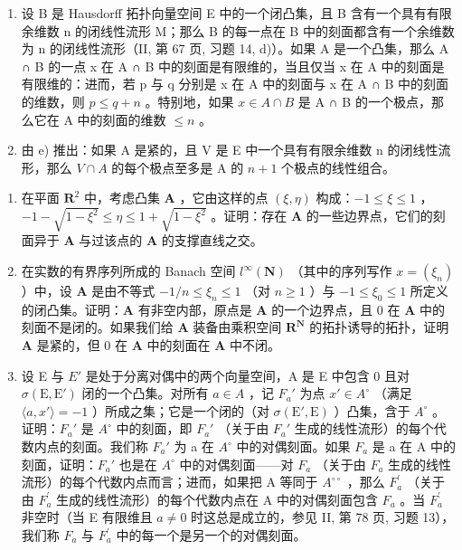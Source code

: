 \begin{enumerate}
\def\labelenumi{\alph{enumi})}
\setcounter{enumi}{4}
\item
  设 B 是 Hausdorff 拓扑向量空间 E 中的一个闭凸集，且 B 含有一个具有有限余维数 n 的闭线性流形 M；那么 B 的每一点在 B 中的刻面都含有一个余维数为 n 的闭线性流形（II, 第 67 页, 习题 14, d)）。如果 A 是一个凸集，那么 A ∩ B 的一点 x 在 A ∩ B 中的刻面是有限维的，当且仅当 x 在 A 中的刻面是有限维的：进而，若 p 与 q 分别是 x 在 A 中的刻面与 x 在 A ∩ B 中的刻面的维数，则 \(p \leqslant q + n\) 。特别地，如果 \(x \in A \cap B\) 是 A ∩ B 的一个极点，那么它在 A 中的刻面的维数 \(\leqslant n\) 。
\item
  由 e) 推出：如果 A 是紧的，且 V 是 E 中一个具有有限余维数 n 的闭线性流形，那么 \(V \cap A\) 的每个极点至多是 A 的 \(n + 1\) 个极点的线性组合。
\end{enumerate}

\begin{enumerate}
\def\labelenumi{\arabic{enumi})}
\setcounter{enumi}{3}
\item
  在平面 \(\mathbf{R}^2\) 中，考虑凸集 \(\mathbf{A}\) ，它由这样的点 \((\xi, \eta)\) 构成：\(-1 \leqslant \xi \leqslant 1\) ，\(-1 - \sqrt{1 - \xi^2} \leqslant \eta \leqslant 1 + \sqrt{1 - \xi^2}\) 。证明：存在 \(\mathbf{A}\) 的一些边界点，它们的刻面异于 \(\mathbf{A}\) 与过该点的 \(\mathbf{A}\) 的支撑直线之交。
\item
  在实数的有界序列所成的 Banach 空间 \(l^{\infty}(\mathbf{N})\) （其中的序列写作 \(x = (\xi_n)\) ）中，设 \(\mathbf{A}\) 是由不等式 \(-1 / n \leqslant \xi_n \leqslant 1\) （对 \(n \geqslant 1\) ）与 \(-1 \leqslant \xi_0 \leqslant 1\) 所定义的闭凸集。证明：\(\mathbf{A}\) 有非空内部，原点是 \(\mathbf{A}\) 的一个边界点，且 0 在 \(\mathbf{A}\) 中的刻面不是闭的。如果我们给 \(\mathbf{A}\) 装备由乘积空间 \(\mathbf{R}^{\mathbf{N}}\) 的拓扑诱导的拓扑，证明 \(\mathbf{A}\) 是紧的，但 0 在 \(\mathbf{A}\) 中的刻面在 \(\mathbf{A}\) 中不闭。
\item
  设 E 与 \(E'\) 是处于分离对偶中的两个向量空间，A 是 E 中包含 0 且对 \(\sigma(\mathrm{E}, \mathrm{E}')\) 闭的一个凸集。对所有 \(a \in A\) ，记 \(F_{a}'\) 为点 \(x' \in A^{\circ}\) （满足 \(\langle a, x' \rangle = -1\) ）所成之集；它是一个闭的（对 \(\sigma(\mathrm{E}', \mathrm{E})\) ）凸集，含于 \(A^{\circ}\) 。证明：\(F_{a}'\) 是 \(A^{\circ}\) 中的刻面，即 \(F_{a}'\) （关于由 \(F_{a}'\) 生成的线性流形）的每个代数内点的刻面。我们称 \(F_{a}'\) 为 a 在 \(A^{\circ}\) 中的对偶刻面。如果 \(F_{a}\) 是 a 在 A 中的刻面，证明：\(F_{a}'\) 也是在 \(A^{\circ}\) 中的对偶刻面——对 \(F_{a}\) （关于由 \(F_{a}\) 生成的线性流形）的每个代数内点而言；进而，如果把 A 等同于 \(A^{\circ\circ}\) ，那么 \(F_{a}^{\prime}\) （关于由 \(F_{a}^{\prime}\) 生成的线性流形）的每个代数内点在 A 中的对偶刻面包含 \(F_{a}\) 。当 \(F_{a}^{\prime}\) 非空时（当 E 有限维且 \(a \neq 0\) 时这总是成立的，参见 II, 第 78 页, 习题 13），我们称 \(F_{a}\) 与 \(F_{a}^{\prime}\) 中的每一个是另一个的对偶刻面。
\end{enumerate}

